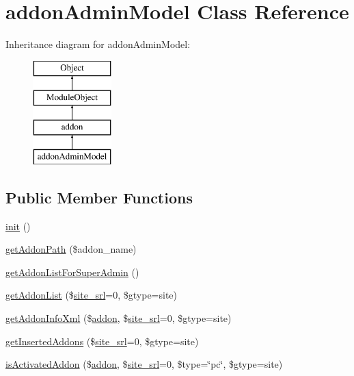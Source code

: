 \hypertarget{classaddonAdminModel}{}\section{addon\+Admin\+Model Class Reference}
\label{classaddonAdminModel}
Inheritance diagram for addon\+Admin\+Model\+:\begin{figure}[H]
\begin{center}
\leavevmode
\includegraphics[height=4.000000cm]{classaddonAdminModel}
\end{center}
\end{figure}
\subsection*{Public Member Functions}
\begin{DoxyCompactItemize}
\item 
\hyperlink{classaddonAdminModel_aed6091be1c24a8c5fcf101b664300b00}{init} ()
\item 
\hyperlink{classaddonAdminModel_ab4fea679a0059be718e449b31a88c46f}{get\+Addon\+Path} (\$addon\+\_\+name)
\item 
\hyperlink{classaddonAdminModel_a056c3d3567ae957b9a5635397dd78b9e}{get\+Addon\+List\+For\+Super\+Admin} ()
\item 
\hyperlink{classaddonAdminModel_a29ec593e854f9686a6ce37be807007c3}{get\+Addon\+List} (\$\hyperlink{ko_8install_8php_a8b1406b4ad1048041558dce6bfe89004}{site\+\_\+srl}=0, \$gtype=\textquotesingle{}site\textquotesingle{})
\item 
\hyperlink{classaddonAdminModel_aa997917b92796be322480902b57d3a9e}{get\+Addon\+Info\+Xml} (\$\hyperlink{classaddon}{addon}, \$\hyperlink{ko_8install_8php_a8b1406b4ad1048041558dce6bfe89004}{site\+\_\+srl}=0, \$gtype=\textquotesingle{}site\textquotesingle{})
\item 
\hyperlink{classaddonAdminModel_a3887ceb3d0d09c833df26669d2ce4f96}{get\+Inserted\+Addons} (\$\hyperlink{ko_8install_8php_a8b1406b4ad1048041558dce6bfe89004}{site\+\_\+srl}=0, \$gtype=\textquotesingle{}site\textquotesingle{})
\item 
\hyperlink{classaddonAdminModel_ad5ad4ef60bc3c9f1fd1fafd63568011a}{is\+Activated\+Addon} (\$\hyperlink{classaddon}{addon}, \$\hyperlink{ko_8install_8php_a8b1406b4ad1048041558dce6bfe89004}{site\+\_\+srl}=0, \$type=\char`\"{}pc\char`\"{}, \$gtype=\textquotesingle{}site\textquotesingle{})
\end{DoxyCompactItemize}
